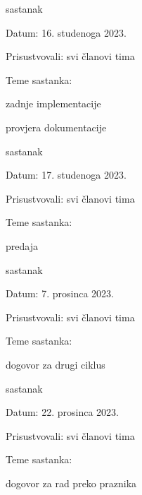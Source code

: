 \begin{packed_enum}
			\item  sastanak
			\item[] \begin{packed_item}
				\item Datum: 16. studenoga 2023.
				\item Prisustvovali: svi članovi tima
				\item Teme sastanka:
				\begin{packed_item}
					\item  zadnje implementacije
					\item  provjera dokumentacije
				\end{packed_item}
			\end{packed_item}
			
			\item  sastanak
			\item[] \begin{packed_item}
				\item Datum: 17. studenoga 2023.
				\item Prisustvovali: svi članovi tima
				\item Teme sastanka:
				\begin{packed_item}
					\item  predaja 
				\end{packed_item}
			\end{packed_item}
			
			\item  sastanak
			\item[] \begin{packed_item}
				\item Datum: 7. prosinca 2023.
				\item Prisustvovali: svi članovi tima
				\item Teme sastanka:
				\begin{packed_item}
					\item  dogovor za drugi ciklus
				\end{packed_item}
			\end{packed_item}
			
			\item  sastanak
			\item[] \begin{packed_item}
				\item Datum: 22. prosinca 2023.
				\item Prisustvovali: svi članovi tima
				\item Teme sastanka:
				\begin{packed_item}
					\item  dogovor za rad preko praznika
				\end{packed_item}
			\end{packed_item}
			

\end{packed_enum}
